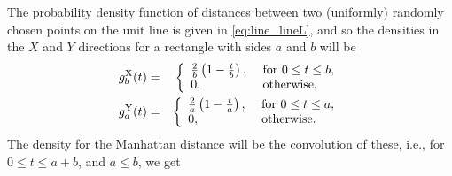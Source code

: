 The probability density function of distances between two (uniformly)
randomly chosen points on the unit line is given in
\eqref{eq:line_lineL}, and so the densities in the $X$ and $Y$
directions for a rectangle with sides $a$ and $b$ will be
\begin{eqnarray}
  \label{eq:rect_xy}
  g^{\rm X}_b(t) & = & \left\{ \begin{array}{ll}
                    \frac{2}{b} \left( 1-\frac{t}{b} \right), &
                         \mbox{ for } 0 \leq t \leq b, \\
                    0, & \mbox{ otherwise}, \\
                  \end{array} \right. \nonumber \\
  g^{\rm Y}_a(t) & = & \left\{ \begin{array}{ll}
                    \frac{2}{a} \left( 1-\frac{t}{a} \right), &
                         \mbox{ for } 0 \leq t \leq a, \\
                    0, & \mbox{ otherwise}. \\
                  \end{array} \right. \nonumber 
\end{eqnarray}
The density for the Manhattan distance will be the convolution of
these, i.e., for $0 \leq t \leq a+b$, and $a \leq b$, we get
